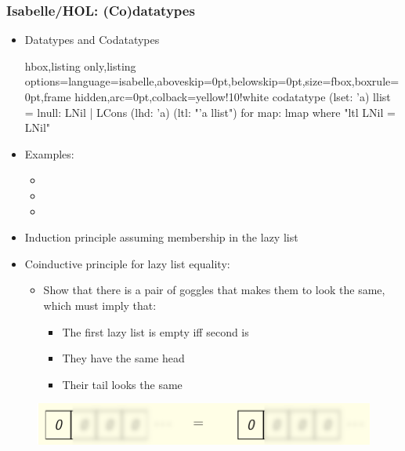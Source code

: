 \documentclass[aspectratio=169,10pt]{beamer}
\begin{document}
\begin{frame}
  \frametitle{Isabelle/HOL: (Co)datatypes}
  \begin{itemize}
    \item Datatypes and Codatatypes
\vspace*{-1ex}
          \begin{tcblisting}{hbox,listing only,listing options={language=isabelle,aboveskip=0pt,belowskip=0pt},size=fbox,boxrule=0pt,frame hidden,arc=0pt,colback=yellow!10!white}
codatatype (lset: 'a) llist = lnull: LNil | LCons (lhd: 'a) (ltl: "'a llist")
  for map: lmap where "ltl LNil = LNil"
          \end{tcblisting}
\vspace*{-1ex}
    \item Examples:
          \begin{itemize}
            \item {}
            \item {}
            \item {}
          \end{itemize}
\vspace*{-1ex}
    \item Induction principle assuming membership in the lazy list
    \item Coinductive principle for lazy list equality:
          \begin{itemize}
            \item Show that there is a pair of goggles that makes them to look the same, which must imply that:
                  \begin{itemize}
                    \item The first lazy list is empty iff second is
                    \item They have the same head
                    \item Their tail looks the same
                  \end{itemize}
          \end{itemize}
  \end{itemize}
\vspace*{-1ex}
\begin{overlayarea}{\textwidth}{.45\textheight}
  \begin{figure}
    \centering
    \includegraphics[scale=0.4]{equality_2.png}
  \end{figure}
\end{overlayarea}
\end{frame}
\end{document}
